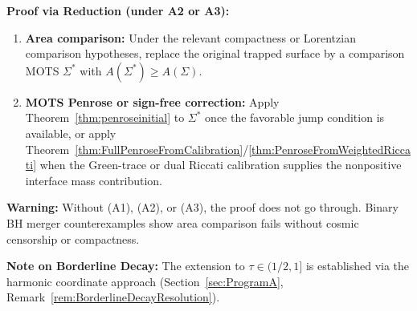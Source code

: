 \begin{theorem}
\textbf{Proof via Reduction (under A2 or A3):}
\begin{enumerate}
    \item \textbf{Area comparison:} Under the relevant compactness or Lorentzian comparison hypotheses, replace the original trapped surface by a comparison MOTS $\Sigma^*$ with $A(\Sigma^*) \ge A(\Sigma)$.
    \item \textbf{MOTS Penrose or sign-free correction:} Apply Theorem~\ref{thm:penroseinitial} to $\Sigma^*$ once the favorable jump condition is available, or apply Theorem~\ref{thm:FullPenroseFromCalibration}/\ref{thm:PenroseFromWeightedRiccati} when the Green-trace or dual Riccati calibration supplies the nonpositive interface mass contribution.
\end{enumerate}

\textbf{Warning:} Without (A1), (A2), or (A3), the proof does not go through. Binary BH merger counterexamples show area comparison fails without cosmic censorship or compactness.

\textbf{Note on Borderline Decay:} The extension to $\tau \in (1/2, 1]$ is established via the harmonic coordinate approach (Section~\ref{sec:ProgramA}, Remark~\ref{rem:BorderlineDecayResolution}).
\end{theorem}


